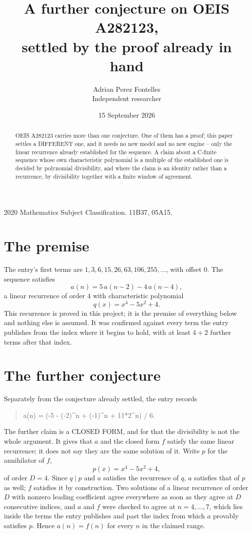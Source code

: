 \documentclass[11pt,a4paper]{article}
\title{A further conjecture on OEIS A282123,\\ \large settled by the proof already in hand}
\author{Adrian Perez Fontelles\\ \small Independent researcher}
\date{15 September 2026}
\theoremstyle{plain}
\theoremstyle{definition}
\begin{document}
\maketitle

\begin{abstract}
OEIS A282123 carries more than one conjecture. One of them has a proof; this paper settles a
DIFFERENT one, and it needs no new model and no new engine -- only the linear recurrence already
established for the sequence. A claim about a C-finite sequence whose own characteristic
polynomial is a multiple of the established one is decided by polynomial divisibility, and where
the claim is an identity rather than a recurrence, by divisibility together with a finite window
of agreement.
\end{abstract}

\noindent\small 2020 Mathematics Subject Classification. 11B37, 05A15.\normalsize

\section{The premise}

The entry's first terms are $1, 3, 6, 15, 26, 63, 106, 255,\dots$, with offset $0$. The sequence satisfies
\[
  a(n)=5\,a(n-2) - 4\,a(n-4) ,
\]
a linear recurrence of order $4$ with characteristic polynomial
\[
  q(x)=x^{4} - 5 x^{2} + 4 .
\]
This recurrence is proved in this project; it is the premise of everything below and nothing else is assumed.
It was confirmed against every term the entry publishes from the index where it begins to hold,
with at least $4+2$ further terms after that index.

\section{The further conjecture}

Separately from the conjecture already settled, the entry records

\begin{quote}\raggedright a(n) = (-5 - (-2)\^{}n + (-1)\^{}n + 11*2\^{}n) / 6.\end{quote}

The further claim is a CLOSED FORM, and for that the divisibility is not the whole argument. It
gives that $a$ and the closed form $f$ satisfy the same linear recurrence; it does not say they
are the same solution of it. Write $p$ for the annihilator of $f$,
\[
  p(x)=x^{4} - 5 x^{2} + 4 ,
\]
of order $D=4$. Since $q\mid p$ and $a$ satisfies the recurrence of $q$, $a$ satisfies that of
$p$ as well; $f$ satisfies it by construction. Two solutions of a linear recurrence of order $D$
with nonzero leading coefficient agree everywhere as soon as they agree at $D$ consecutive
indices, and $a$ and $f$ were checked to agree at $n=4,\dots,7$,
which lies inside the terms the entry publishes and past the index from which $a$ provably
satisfies $p$. Hence $a(n)=f(n)$ for every $n$ in the claimed range.
\end{document}
